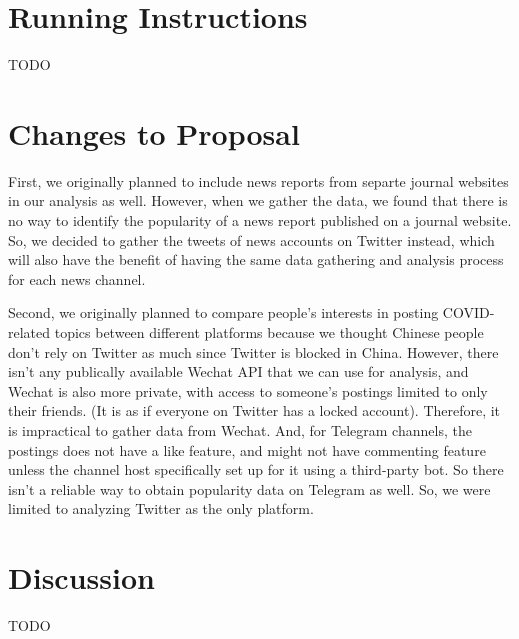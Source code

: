 \documentclass{article}
\begin{document}
    \section{Running Instructions}
    \indent

    TODO

    \section{Changes to Proposal}
    \indent

    First, we originally planned to include news reports from separte journal websites in our analysis as well. However, when we gather the data, we found that there is no way to identify the popularity of a news report published on a journal website. So, we decided to gather the tweets of news accounts on Twitter instead, which will also have the benefit of having the same data gathering and analysis process for each news channel.

    Second, we originally planned to compare people's interests in posting COVID-related topics between different platforms because we thought Chinese people don't rely on Twitter as much since Twitter is blocked in China. However, there isn't any publically available Wechat API that we can use for analysis, and Wechat is also more private, with access to someone's postings limited to only their friends. (It is as if everyone on Twitter has a locked account). Therefore, it is impractical to gather data from Wechat. And, for Telegram channels, the postings does not have a like feature, and might not have commenting feature unless the channel host specifically set up for it using a third-party bot. So there isn't a reliable way to obtain popularity data on Telegram as well. So, we were limited to analyzing Twitter as the only platform.

    \section{Discussion}
    \indent

    TODO
\end{document}
